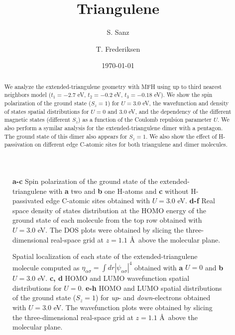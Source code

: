 \documentclass[twocolumn,amsmath,%
amssymb,prb,superscriptaddress]{revtex4}
\begin{document}
\title{Triangulene}

\author{S. Sanz}

\author{T. Frederiksen}

\date{\today}

\begin{abstract}
We analyze the extended-triangulene geometry with MFH using up to third nearest neighbors model ($t_{1}=-2.7$ eV, $t_{2}=-0.2$ eV, $t_{3}=-0.18$ eV). We show the spin polarization of the ground state ($S_{z}=1$) for $ U=3.0$ eV, the wavefunction and density of states spatial distributions for $U=0$ and $3.0$ eV, and the dependency of the different magnetic states (different $S_{z}$) as a function of the Coulomb repulsion parameter $U$. We also perform a symilar analysis for the extended-triangulene dimer with a pentagon. The ground state of this dimer also appears for $S_{z}=1$. We also show the effect of H-passivation on different edge C-atomic sites for both triangulene and dimer molecules.
\end{abstract}

\maketitle

\begin{figure*}
	\scalebox{.6}{}
	\caption{\textbf{a-c} Spin polarization of the ground state of the extended-triangulene with \textbf{a} two and \textbf{b} one H-atoms and \textbf{c} without H-passivated edge C-atomic sites obtained with $U=3.0$ eV. \textbf{d-f} Real space density of states distribution at the HOMO energy of the ground state of each molecule from the top row obtained with $U=3.0$ eV. The DOS plots were obtained by slicing the three-dimensional real-space grid at $z=1.1$ \AA \ above the molecular plane.}
\end{figure*}

\begin{figure*}
	\scalebox{.7}{}
	\caption{Spatial localization of each state of the extended-triangulene molecule computed as $\eta_{\alpha\sigma}=\int dr|\psi_{\alpha\sigma}|^{4}$ obtained with \textbf{a} $U=0$ and \textbf{b} $U=3.0$ eV. \textbf{c, d} HOMO and LUMO wavefunction spatial distributions for $U=0$. \textbf{e-h} HOMO and LUMO spatial distributions of the ground state ($S_{z}=1$) for \emph{up}- and \emph{down}-electrons obtained with $U=3.0$ eV. The wavefunction plots were obtained by slicing the three-dimensional real-space grid at $z=1.1$ \AA \ above the molecular plane.}
\end{figure*}
\end{document}
